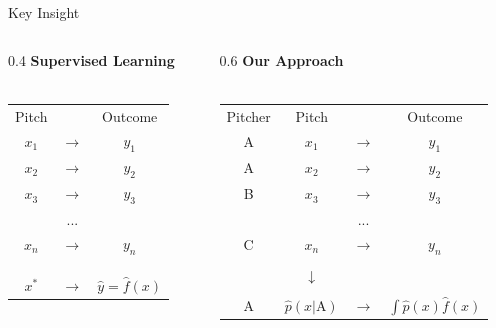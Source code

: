 \documentclass{beamer}
\begin{document}
  \begin{frame}{Key Insight}
    \begin{columns}
      \begin{column}{0.4\columnwidth}
        \centering
        {\bf Supervised Learning}\\
        ~\\
        \begin{tabular}{ccc}
          Pitch &               & Outcome\\
          $x_1$ & $\rightarrow$ & $y_1$\\
          $x_2$ & $\rightarrow$ & $y_2$\\
          $x_3$ & $\rightarrow$ & $y_3$\\
                & ...           &      \\
          $x_n$ & $\rightarrow$ & $y_n$\\
          \\
          \\
          \\
          $x^*$ & $\rightarrow$ & $\hat y = \hat f(x)$\\
        \end{tabular}
      \end{column}
      \begin{column}{0.6\columnwidth}
        \centering
        \alert{\bf Our Approach}\\
        ~\\
        \begin{tabular}{cccc}
          Pitcher & Pitch &               & Outcome\\
          A       & $x_1$ & $\rightarrow$ & $y_1$\\
          A       & $x_2$ & $\rightarrow$ & $y_2$\\
          B       & $x_3$ & $\rightarrow$ & $y_3$\\
                  &       & ...           &      \\
          C       & $x_n$ & $\rightarrow$ & $y_n$\\
                  & \\
                  & \alert{$\downarrow$}\\
                  & \\
          A       & \alert{$\hat p(x|\text{A})$} & \alert{$\rightarrow$} & \alert{$\int\hat p(x)\hat f(x)$}\\
        \end{tabular}
      \end{column}
    \end{columns}
  \end{frame}
\end{document}
